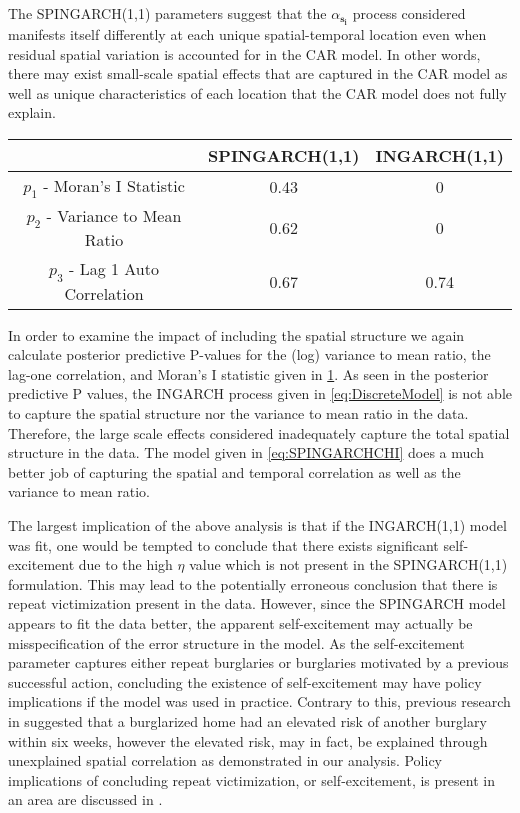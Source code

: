\documentclass[11pt]{isuthesis}
\begin{document}
The SPINGARCH(1,1) parameters suggest that the $\alpha_{\boldsymbol{s_i}}$ process considered manifests itself differently at each unique spatial-temporal location even when residual spatial variation is accounted for in the CAR model.  In other words, there may exist small-scale spatial effects that are captured in the CAR model as well as unique characteristics of each location that the CAR model does not fully explain.
  
\begin{table}[!htp]
	 \label{Table:Pvals} 
	\begin{center}
		\begin{tabular}{ |c|c|c| } 
			\hline
			& SPINGARCH(1,1) & INGARCH(1,1)\\
			\hline 
			$p_1$ - Moran's I Statistic& 0.43 & 0 \\
			$p_2$ - Variance to Mean Ratio & 0.62 & 0\\
			$p_3$ - Lag 1 Auto Correlation & 0.67 & 0.74 \\ 
			\hline
		\end{tabular}
	\end{center}
\end{table}
In order to examine the impact of including the spatial structure we again calculate posterior predictive P-values for the (log) variance to mean ratio, the lag-one correlation, and Moran's I statistic given in \ref{Table:Pvals}.  As seen in the posterior predictive P values, the INGARCH process given in \eqref{eq:DiscreteModel} is not able to capture the spatial structure nor the variance to mean ratio in the data.  Therefore, the large scale effects considered inadequately capture the total spatial structure in the data. The model given in \eqref{eq:SPINGARCHCHI} does a much better job of capturing the spatial and temporal correlation as well as the variance to mean ratio. 

The largest implication of the above analysis is that if the INGARCH(1,1) model was fit, one would be tempted to conclude that there exists significant self-excitement due to the high $\eta$ value which is not present in the SPINGARCH(1,1) formulation.  This may lead to the potentially erroneous conclusion that there is repeat victimization present in the data.   However, since the SPINGARCH model appears to fit the data better, the apparent self-excitement may actually be misspecification of the error structure in the model.  As the self-excitement parameter captures either repeat burglaries or burglaries motivated by a previous successful action, concluding the existence of self-excitement may have policy implications if the model was used in practice.  Contrary to this, previous research in \cite{polvi1991time} suggested that a burglarized home had an elevated risk of another burglary within six weeks, however the elevated risk, may in fact, be explained through unexplained spatial correlation as demonstrated in our analysis.  Policy implications of concluding repeat victimization, or self-excitement, is present in an area are discussed in \cite{pease1998repeat}.  
\end{document}
